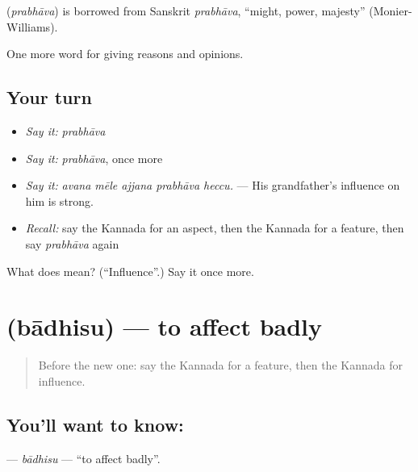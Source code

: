 \begin{cousinweb}
\textbf{} (\emph{prabhāva}) is borrowed from Sanskrit \emph{prabhāva}, \textquotedblleft{}might, power, majesty\textquotedblright{} (Monier-Williams).
\end{cousinweb}

\begin{grammarlens}[title={What you've built}]
One more word for giving reasons and opinions.
\end{grammarlens}

\subsection*{Your turn}
\begin{itemize}
\raggedright
  \item \emph{Say it:} \emph{prabhāva}
  \item \emph{Say it:} \emph{prabhāva}, once more
  \item \emph{Say it:} \emph{avana mēle ajjana prabhāva heccu.} — His grandfather's influence on him is strong.
  \item \emph{Recall:} say the Kannada for an aspect, then the Kannada for a feature, then say \emph{prabhāva} again
\end{itemize}

\begin{tcolorbox}[breakable,colback=teal!4,colframe=teal!35!black,title={Before you move on}]
What does  mean? (\textquotedblleft{}Influence\textquotedblright{}.) Say it once more.
\end{tcolorbox}
\section[\texorpdfstring{\kn{ಬಾಧಿಸು} (bādhisu)}{ಬಾಧಿಸು (bādhisu)}]{ (bādhisu) — to affect badly}

\label{lesson:KA-C385-badhisu}



\begin{quote}
Before the new one: say the Kannada for a feature, then the Kannada for influence.
\end{quote}

\subsection*{You'll want to know: }
\textbf{} — \emph{bādhisu} — \textquotedblleft{}to affect badly\textquotedblright{}.

